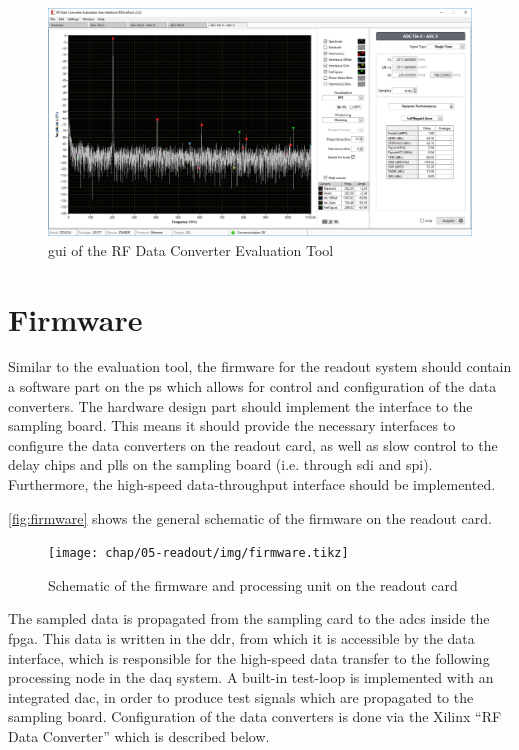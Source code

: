\begin{figure}[tbh]
	\centering
	\includegraphics[width = \textwidth]{chap/05-readout/img/evaltool}
	\caption{\gls{gui} of the RF Data Converter Evaluation Tool}
	\label{fig:gui}
\end{figure}

\section{Firmware}\label{sec:firmware}
Similar to the evaluation tool, the firmware for the readout system should contain a software part on the \gls{ps} which allows for control and configuration of the data converters. 
The hardware design part should implement the interface to the sampling board. 
This means it should provide the necessary interfaces to configure the data converters on the readout card, as well as slow control to the delay chips and \glspl{pll} on the sampling board (i.e. through \gls{sdi} and \gls{spi}). 
Furthermore, the high-speed data-throughput interface should be implemented.

\autoref{fig:firmware} shows the general schematic of the firmware on the readout card.
\begin{figure}[tbh]
	\centering
	\texttt{[image: chap/05-readout/img/firmware.tikz]}
	\caption{Schematic of the firmware and processing unit on the readout card}
	\label{fig:firmware}
\end{figure}

The sampled data is propagated from the sampling card to the \glspl{adc} inside the \gls{fpga}. 
This data is written in the \gls{ddr}, from which it is accessible by the data interface, which is responsible for the high-speed data transfer to the following processing node in the \gls{daq} system.
A built-in test-loop is implemented with an integrated \gls{dac}, in order to produce test signals which are propagated to the sampling board.
Configuration of the data converters is done via the Xilinx ``RF Data Converter'' which is described below. 

